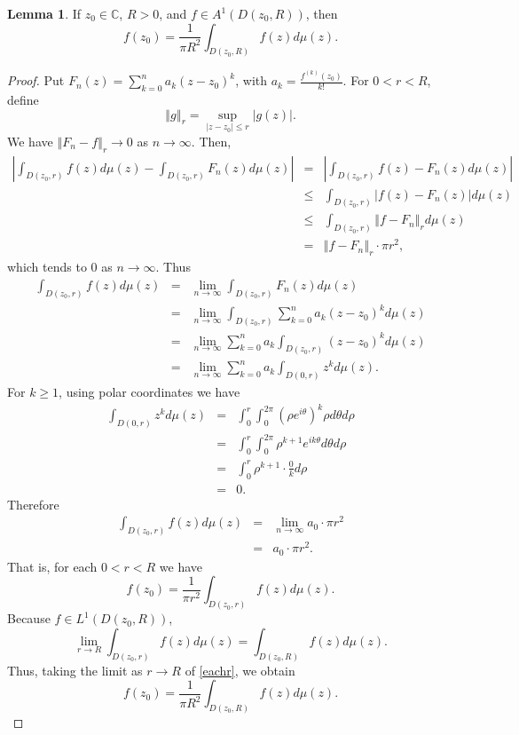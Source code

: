 \documentclass{article}
\newcommand{\norm}[1]{\left\Vert #1 \right\Vert}
\theoremstyle{definition}
\newtheorem{lemma}[theorem]{Lemma}
\begin{document}
\begin{lemma}
If $z_0 \in \mathbb{C}$, $R>0$, and $f \in A^1(D(z_0,R))$, then
\[
f(z_0)=\frac{1}{\pi R^2} \int_{D(z_0,R)} f(z) d\mu(z).
\]
\label{meanvalue}
\end{lemma}
\begin{proof}
Put $F_n(z)=\sum_{k=0}^n a_k (z-z_0)^k$, with $a_k=\frac{f^{(k)}(z_0)}{k!}$. For $0<r<R$,
define
\[
\norm{g}_r=\sup_{|z-z_0| \leq r} |g(z)|.
\]
We have $\norm{F_n - f}_r \to 0$ as $n \to \infty$. Then,
\begin{eqnarray*}
\left| \int_{D(z_0,r)} f(z) d\mu(z) - \int_{D(z_0,r)} F_n(z) d\mu(z) \right|&=&
\left| \int_{D(z_0,r)} f(z)-F_n(z) d\mu(z) \right|\\
&\leq&\int_{D(z_0,r)} |f(z)-F_n(z)| d\mu(z)\\
&\leq&\int_{D(z_0,r)} \norm{f-F_n}_r d\mu(z)\\
&=&\norm{f-F_n}_r \cdot \pi r^2,
\end{eqnarray*}
which tends to $0$ as $n \to \infty$. Thus
\begin{eqnarray*}
\int_{D(z_0,r)} f(z) d\mu(z)&=&\lim_{n \to \infty} \int_{D(z_0,r)} F_n(z) d\mu(z)\\
&=&\lim_{n \to \infty}  \int_{D(z_0,r)} \sum_{k=0}^n a_k  (z-z_0)^k d\mu(z)\\
&=&\lim_{n \to \infty} \sum_{k=0}^n a_k \int_{D(z_0,r)} (z-z_0)^k d\mu(z)\\
&=&\lim_{n \to \infty} \sum_{k=0}^n a_k \int_{D(0,r)} z^k d\mu(z).
\end{eqnarray*}
For $k \geq 1$, using polar coordinates we have
\begin{eqnarray*}
\int_{D(0,r)} z^k d\mu(z)&=&\int_0^r \int_0^{2\pi} (\rho e^{i\theta})^k \rho d\theta d\rho\\
&=&\int_0^r \int_0^{2\pi} \rho^{k+1} e^{ik\theta} d\theta d\rho\\
&=&\int_0^r \rho^{k+1} \cdot \frac{0}{k} d\rho\\
&=&0.
\end{eqnarray*}
Therefore
\begin{eqnarray*}
\int_{D(z_0,r)} f(z) d\mu(z)&=& \lim_{n \to \infty} a_0 \cdot \pi r^2\\
&=&a_0\cdot \pi r^2.
\end{eqnarray*}
That is, for each $0<r<R$ we have
\begin{equation}
f(z_0)=\frac{1}{\pi r^2} \int_{D(z_0,r)} f(z) d\mu(z).
\label{eachr}
\end{equation}
Because $f \in L^1(D(z_0,R))$, 
\[
\lim_{r \to R} \int_{D(z_0,r)} f(z) d\mu(z) = \int_{D(z_0,R)} f(z) d\mu(z).
\]
Thus, taking the limit as $r \to R$ of \eqref{eachr}, we obtain
\[
f(z_0)=\frac{1}{\pi R^2} \int_{D(z_0,R)} f(z) d\mu(z).
\]
\end{proof}
\end{document}
